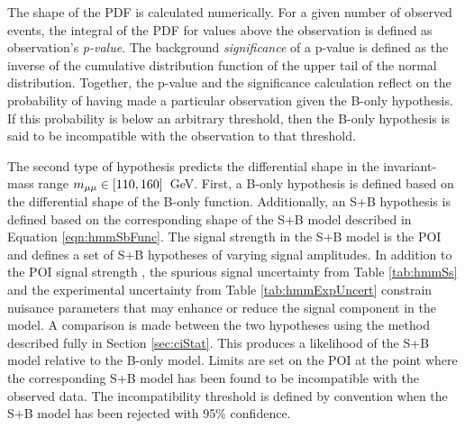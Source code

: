 The shape of the PDF is calculated numerically.
For a given number of observed events, the integral of the PDF for values above the observation is defined as observation's \emph{p-value}.
The background \emph{significance} of a p-value is defined as the inverse of the cumulative distribution function of the upper tail of the normal distribution.
Together, the p-value and the significance calculation reflect on the probability of having made a particular observation given the B-only hypothesis.
If this probability is below an arbitrary threshold, then the B-only hypothesis is said to be incompatible with the observation to that threshold.

The second type of hypothesis predicts the differential \muu shape in the invariant-mass range $m_{\mu\mu}\in[110,160]$~GeV.
First, a B-only hypothesis is defined based on the differential shape of the B-only function.
Additionally, an S+B hypothesis is defined based on the corresponding shape of the S+B model described in Equation \ref{eqn:hmmSbFunc}.
The signal strength \mus in the S+B model is the POI and defines a set of S+B hypotheses of varying signal amplitudes.
In addition to the POI signal strength \mus, the spurious signal uncertainty from Table \ref{tab:hmmSs} and the experimental uncertainty from Table \ref{tab:hmmExpUncert} constrain nuisance parameters that may enhance or reduce the signal component in the model.
A comparison is made between the two hypotheses using the \cls method described fully in Section \ref{sec:ciStat}.
This produces a likelihood of the S+B model relative to the B-only model.
Limits are set on the POI at the point where the corresponding S+B model has been found to be incompatible with the observed data.
The incompatibility threshold is defined by convention when the S+B model has been rejected with 95\% confidence.  

